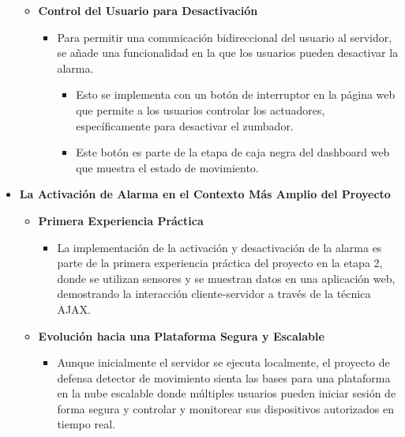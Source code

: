 \documentclass{report}
\begin{document}
\begin{itemize}
\begin{itemize}
        \item \textbf{Control del Usuario para Desactivación}
        \begin{itemize}
            \item Para permitir una comunicación bidireccional del usuario al servidor, se añade una funcionalidad en la que los usuarios pueden desactivar 
            la alarma.
            \begin{itemize}
                \item Esto se implementa con un botón de interruptor en la página web que permite a los usuarios controlar los actuadores, específicamente 
                para desactivar el zumbador.
                \item Este botón es parte de la etapa de caja negra del dashboard web que muestra el estado de movimiento.
            \end{itemize}
        \end{itemize} 
    \end{itemize}

    \item \textbf{La Activación de Alarma en el Contexto Más Amplio del Proyecto}
    \begin{itemize}
        \item \textbf{Primera Experiencia Práctica}
        \begin{itemize}
            \item La implementación de la activación y desactivación de la alarma es parte de la primera experiencia práctica del proyecto en la etapa 2, 
            donde se utilizan sensores y se muestran datos en una aplicación web, demostrando la interacción cliente-servidor a través de la técnica AJAX.
        \end{itemize}

        \item \textbf{Evolución hacia una Plataforma Segura y Escalable}
        \begin{itemize}
            \item Aunque inicialmente el servidor se ejecuta localmente, el proyecto de defensa detector de movimiento sienta las bases para una plataforma en la nube 
            escalable donde múltiples usuarios pueden iniciar sesión de forma segura y controlar y monitorear sus dispositivos autorizados en tiempo real.
        \end{itemize}


\end{itemize}
\end{itemize}
\end{document}
